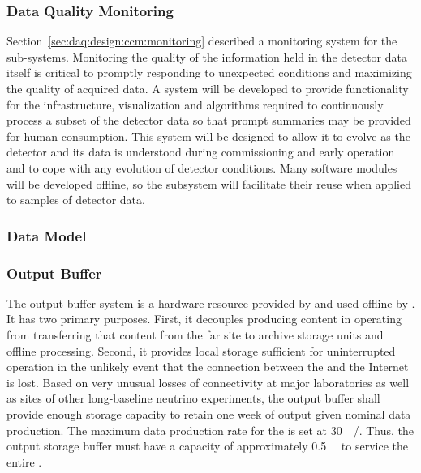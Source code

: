 \subsubsection{Data Quality Monitoring}
\label{sec:fd-daq:design-data-quality}

Section~\ref{sec:daq:design:ccm:monitoring} described a monitoring system for the  sub-systems. 
Monitoring the quality of the information held in the detector data itself is critical to promptly responding to unexpected conditions and maximizing the quality of acquired data. 
A   system will be developed to provide functionality for the infrastructure, visualization and algorithms required to continuously process a subset of the detector data so that prompt summaries may be provided for human consumption.
This system will be designed to allow it to evolve as the detector and its data is understood during commissioning and early operation and to cope with any evolution of detector conditions.
Many software modules will be developed offline, so the  subsystem will facilitate their reuse when applied to samples of detector data.


\subsubsection{Data Model}
\label{sec:fd-daq:design-data-model}


\subsubsection{Output Buffer}


The output buffer system is a hardware resource provided by  and used offline by . 
It has two primary purposes. 
First, it decouples producing content in operating  from transferring that content from the far site to archive storage units and offline processing. 
Second, it provides local storage sufficient for uninterrupted  operation in the unlikely event that the connection between the  and the Internet is lost. 
Based on very unusual losses of connectivity at major laboratories as well as  sites of other long-baseline neutrino experiments, the output buffer shall provide enough storage capacity to retain one week of output given nominal data production. 
The maximum data production rate for the  is set at \SI{30}{\peta\byte/\year}. 
Thus, the output storage buffer must have a capacity of approximately \SI{0.5}{\peta\byte} to service the entire .




